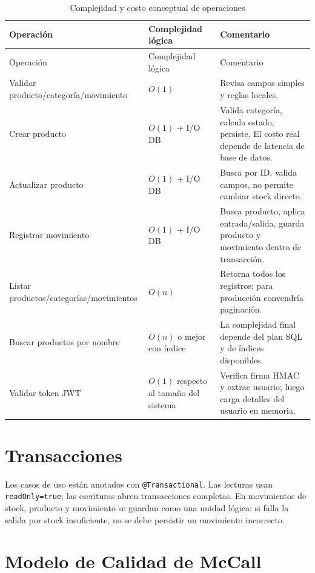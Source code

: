 \documentclass[11pt,oneside]{report}
\begin{document}
\begin{longtable}{p{4.1cm} p{3.1cm} p{7.1cm}}
\caption{Complejidad y costo conceptual de operaciones}\\
\toprule
Operación & Complejidad lógica & Comentario \\
\midrule
\endfirsthead
\toprule
Operación & Complejidad lógica & Comentario \\
\midrule
\endhead
Validar producto/categoría/movimiento & $O(1)$ & Revisa campos simples y reglas locales.\\
Crear producto & $O(1)$ + I/O DB & Valida categoría, calcula estado, persiste. El costo real depende de latencia de base de datos.\\
Actualizar producto & $O(1)$ + I/O DB & Busca por ID, valida campos, no permite cambiar stock directo.\\
Registrar movimiento & $O(1)$ + I/O DB & Busca producto, aplica entrada/salida, guarda producto y movimiento dentro de transacción.\\
Listar productos/categorías/movimientos & $O(n)$ & Retorna todos los registros; para producción convendría paginación.\\
Buscar productos por nombre & $O(n)$ o mejor con índice & La complejidad final depende del plan SQL y de índices disponibles.\\
Validar token JWT & $O(1)$ respecto al tamaño del sistema & Verifica firma HMAC y extrae usuario; luego carga detalles del usuario en memoria.\\
\bottomrule
\end{longtable}

\section{Transacciones}

Los casos de uso están anotados con \texttt{@Transactional}. Las lecturas usan \texttt{readOnly=true}; las escrituras abren transacciones completas. En movimientos de stock, producto y movimiento se guardan como una unidad lógica: si falla la salida por stock insuficiente, no se debe persistir un movimiento incorrecto.

\section{Modelo de Calidad de McCall}
\end{document}
